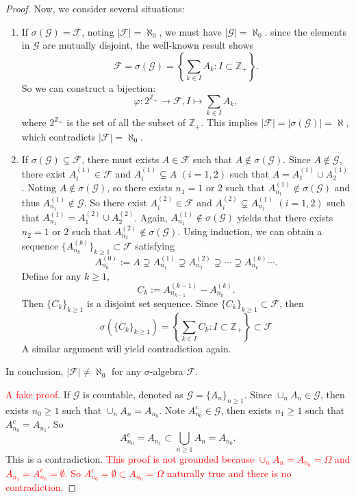 \documentclass[12pt]{article}
\renewcommand{\(}{\left(}%
\renewcommand{\)}{\right)}%
\renewcommand{\[}{\left[}%
\renewcommand{\]}{\right]}%
\newcommand{\z}{\mathbb{Z}}
\newcommand{\f}{\mathscr{F}}
\newcommand{\g}{\mathscr{G}}
\newtheorem{proof}{Proof.}}
\begin{document}
\begin{proof}
  	Now, we consider several situations:
  	\begin{enumerate}
  		\item If $\sigma(\g)=\f$, noting $|\f|=\aleph_0$, we must have $|\g|=\aleph_0$. since the elements in $\g$ are mutually disjoint, the well-known result shows 
  		\begin{equation*}
  			\f=\sigma(\g)=\left\{\sum_{k\in I}A_k:I\subset \z_+ \right\}.
  		\end{equation*}
  		So we can construct a bijection:
  		\begin{equation*}
  			\varphi : 2^{\z_+}\to \f,I\mapsto \sum_{k\in I}A_k,
  		\end{equation*}
  		where $2^{\z_+}$ is the set of all the subset of $\z_+$. This implies $|\f|=|\sigma(\g)|=\aleph$, which contradicts $|\f|=\aleph_0$.
  		\item If $\sigma(\g)\subsetneq \f$, there must exists $A\in\f$ such that $A\notin \sigma(\g)$. Since $A\notin\g$, there exist $A^{(1)}_i\in \f$ and $A^{(1)}_i\subsetneq A$ $(i=1,2)$ such that $A=A_1^{(1)}\cup A_2^{(1)}$. Noting $A\notin \sigma(\g)$, so there exists $n_1=1$ or $2$ such that $A^{(1)}_{n_1}\notin \sigma(\g)$ and thus $A^{(1)}_{n_1}\notin \g$. So there exist $A^{(2)}_i\in \f$ and $A^{(2)}_i\subsetneq A^{(1)}_{n_1}$ $(i=1,2)$ such that $A^{(1)}_{n_1}=A_1^{(2)}\cup A_2^{(2)}$. Again, $A^{(1)}_{n_1}\notin \sigma(\g)$ yields that there exists $n_2=1$ or $2$ such that $A^{(2)}_{n_2}\notin\sigma(\g)$. Using induction, we can obtain a sequence $\{A^{(k)}_{n_k}\}_{k\geq 1}\subset\f$ satisfying
  		\begin{equation*}
  			A^{(0)}_{n_0}:=A\supsetneq A^{(1)}_{n_1}\supsetneq A^{(2)}_{n_2}\supsetneq \cdots \supsetneq A^{(k)}_{n_k}\cdots.
  		\end{equation*}
  		Define for any $k\geq 1$, 
   \begin{equation*}
    C_k:=A_{n_{k-1}}^{(k-1)}-A_{n_{k}}^{(k)}.
   \end{equation*}
   Then $\{C_k\}_{k\geq 1}$ is a disjoint set sequence. Since $\{C_k\}_{k\geq 1}\subset \f$, then 
   \begin{equation*}
   	\sigma\(\{C_k\}_{k\geq 1}\)=\left\{\sum_{k\in I}C_k:I\subset \z_+ \right\}\subset \f
   \end{equation*}
   A similar argument will yield contradiction again. 
  	\end{enumerate}
  	In conclusion, $|\f|\neq \aleph_0$ for any $\sigma$-algebra $\f$.

   
   
   \textcolor{red}{A fake proof}. If $\g$ is countable, denoted as $\g=\{A_n\}_{n\geq 1}$. Since $\cup_{n}A_n\in\g$, then exists $n_0\geq 1$ such that $\cup_{n}A_n=A_{n_0}$. Note $A_{n_0}^c\in\g$, then exists $n_1\geq 1$ such that $A_{n_0}^c=A_{n_1}$. So
   	\begin{equation*}
   		A_{n_0}^c=A_{n_1}\subset \bigcup_{n\geq 1}A_n=A_{n_0}.
   	\end{equation*}
   	This is a contradiction. \textcolor{red}{ This proof is not grounded because $\cup_n A_n=A_{n_0}=\Omega$ and $A_{n_1}=A_{n_0}^c=\emptyset$. So $A_{n_0}^c=\emptyset\subset A_{n_0}=\Omega$ naturally true and there is no contradiction.}
  \end{proof}
\end{document}
